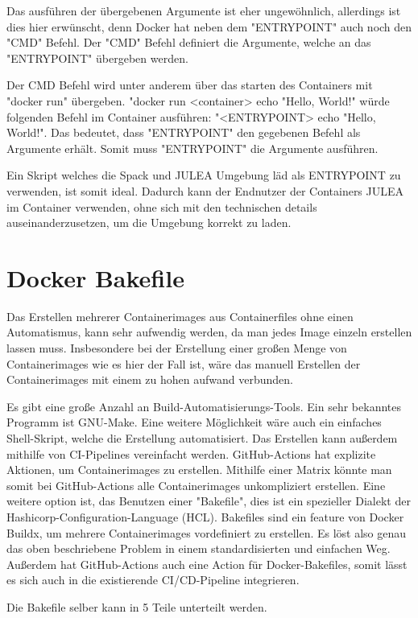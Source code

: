 Das ausführen der übergebenen Argumente ist eher ungewöhnlich, allerdings ist dies hier erwünscht, denn Docker hat neben dem "ENTRYPOINT" auch noch den "CMD" Befehl. Der "CMD" Befehl definiert die Argumente, welche an das "ENTRYPOINT" übergeben werden. 

Der CMD Befehl wird unter anderem über das starten des Containers mit "docker run" übergeben. "docker run <container> echo "Hello, World!" würde folgenden Befehl im Container ausführen: "<ENTRYPOINT> echo "Hello, World!". Das bedeutet, dass "ENTRYPOINT" den gegebenen Befehl als Argumente erhält. Somit muss "ENTRYPOINT" die Argumente ausführen.

Ein Skript welches die Spack und JULEA Umgebung läd als ENTRYPOINT zu verwenden, ist somit ideal. Dadurch kann der Endnutzer der Containers JULEA im Container verwenden, ohne sich mit den technischen details auseinanderzusetzen, um die Umgebung korrekt zu laden.

\section{Docker Bakefile}

Das Erstellen mehrerer Containerimages aus Containerfiles ohne einen Automatismus, kann sehr aufwendig werden, da man jedes Image einzeln erstellen lassen muss. Insbesondere bei der Erstellung einer großen Menge von Containerimages wie es hier der Fall ist, wäre das manuell Erstellen der Containerimages mit einem zu hohen aufwand verbunden. 

Es gibt eine große Anzahl an Build-Automatisierungs-Tools. Ein sehr bekanntes Programm ist GNU-Make. Eine weitere Möglichkeit wäre auch ein einfaches Shell-Skript, welche die Erstellung automatisiert. Das Erstellen kann außerdem mithilfe von CI-Pipelines vereinfacht werden. GitHub-Actions hat explizite Aktionen, um Containerimages zu erstellen. Mithilfe einer Matrix könnte man somit bei GitHub-Actions alle Containerimages unkompliziert erstellen. Eine weitere option ist, das Benutzen einer "Bakefile", dies ist ein spezieller Dialekt der Hashicorp-Configuration-Language (HCL). Bakefiles sind ein feature von Docker Buildx, um mehrere Containerimages vordefiniert zu erstellen. Es löst also genau das oben beschriebene Problem in einem standardisierten und einfachen Weg. Außerdem hat GitHub-Actions auch eine Action für Docker-Bakefiles, somit lässt es sich auch in die existierende CI/CD-Pipeline integrieren. 

Die Bakefile selber kann in 5 Teile unterteilt werden.

